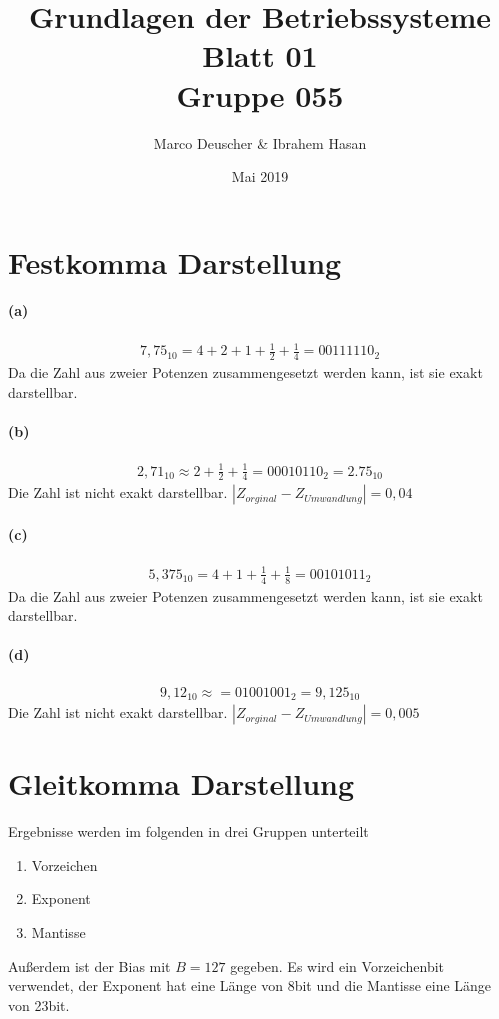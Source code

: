 \documentclass[a4paper]{article}
\title{Grundlagen der Betriebssysteme\\ Blatt 01 \\ Gruppe 055}
\author{Marco Deuscher & Ibrahem Hasan}
\date{Mai 2019}
\begin{document}
\maketitle
\section{Festkomma Darstellung}
\paragraph{(a)}
\begin{align*}
    7,75_{10}=4+2+1+\frac{1}{2}+\frac{1}{4}=00111110_2
\end{align*}
Da die Zahl aus zweier Potenzen zusammengesetzt werden kann, ist sie exakt darstellbar.


\paragraph{(b)}
\begin{align*}
    2,71_{10}\approx2+\frac{1}{2}+\frac{1}{4}=00010110_2=2.75_{10}
\end{align*}
Die Zahl ist nicht exakt darstellbar. $|Z_{orginal}-Z_{Umwandlung}|=0,04$


\paragraph{(c)}
\begin{align*}
    5,375_{10} = 4+1+\frac{1}{4}+\frac{1}{8}=00101011_2
\end{align*}
Da die Zahl aus zweier Potenzen zusammengesetzt werden kann, ist sie exakt darstellbar.

\paragraph{(d)}
\begin{align*}
    9,12_{10}\approx=01001001_2=9,125_{10}
\end{align*}
Die Zahl ist nicht exakt darstellbar. $|Z_{orginal}-Z_{Umwandlung}|=0,005$

\section{Gleitkomma Darstellung}
Ergebnisse werden im folgenden in drei Gruppen unterteilt
\begin{enumerate}
    \item Vorzeichen
    \item Exponent
    \item Mantisse
\end{enumerate}
Außerdem ist der Bias mit $B=127$ gegeben. Es wird ein Vorzeichenbit verwendet, der Exponent hat eine Länge von 8bit und die Mantisse eine Länge von 23bit.
\end{document}
